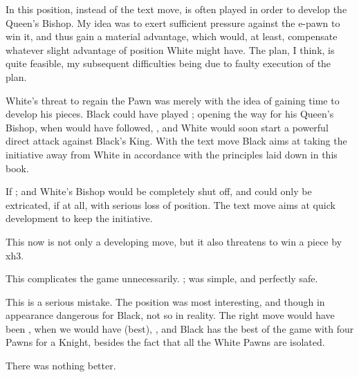 \documentclass[10pt,twoside]{article}
\begin{document}
In this position, instead of the text move,  is often played in order to develop the Queen's Bishop. My idea was to exert sufficient pressure against the e-pawn to win it, and thus gain a material advantage, which would, at least, compensate whatever slight advantage of position White might have. The plan, I think, is quite feasible, my subsequent difficulties being due to faulty execution of the plan.


\board


White's threat to regain the Pawn was merely with the idea of gaining time to develop his pieces. Black could have played ; opening the way for his Queen's Bishop, when would have followed, , and White would soon start a powerful direct attack against Black's King. With the text move Black aims at taking the initiative away from White in accordance with the principles laid down in this book.


If ; and White's Bishop would be completely shut off, and could only be extricated, if at all, with serious loss of position. The text move aims at quick development to keep the initiative.


This now is not only a developing move, but it also threatens to win a piece by \figB xh3.


This complicates the game unnecessarily. ; was simple, and perfectly safe.


\board


This is a serious mistake. The position was most interesting, and though in appearance dangerous for Black, not so in reality. The right move would have been , when we would have  (best), , and Black has the best of the game with four Pawns for a Knight, besides the fact that all the White Pawns are isolated.


There was nothing better.
\end{document}
